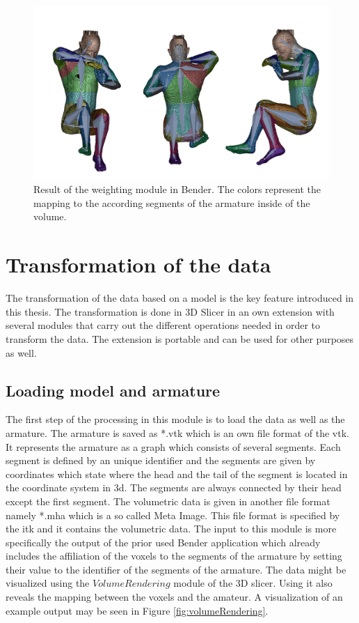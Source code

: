 \begin{figure} [!htb]
    \centering
	\includegraphics[width=12cm]{content/images/weight}
	\caption{Result of the weighting module in Bender. The colors represent the mapping to the according segments of the armature inside of the volume.} 
	\label{fig:weight}
\end{figure}


\newpage
\section{Transformation of the data}\label{sec:transformation}

The transformation of the data based on a model is the key feature introduced in this thesis. The transformation is done in 3D Slicer \cite{Slicer3DSlicer, Fedorov20123DNetwork} in an own extension with several modules that carry out the different operations needed in order to transform the data. The extension is portable and can be used for other purposes as well.

\subsection{Loading model and armature}

The first step of the processing in this module is to load the data as well as the armature. The armature is saved as *.vtk which is an own file format of the \gls{vtk}. It represents the armature as a graph which consists of several segments. Each segment is defined by an unique identifier and the segments are given by coordinates which state where the head and the tail of the segment is located in the coordinate system in \gls{3d}. The segments are always connected by their head except the first segment. The volumetric data is given in another file format namely *.mha which is a so called Meta Image. This file format is specified by the \gls{itk} and it contains the volumetric data. The input to this module is more specifically the output of the prior used Bender application which already includes the affiliation of the voxels to the segments of the armature by setting their value to the identifier of the segments of the armature. The data might be visualized using the $VolumeRendering$ module of the 3D slicer. Using it also reveals the mapping between the voxels and the amateur. A visualization of an example output may be seen in Figure \ref{fig:volumeRendering}.


